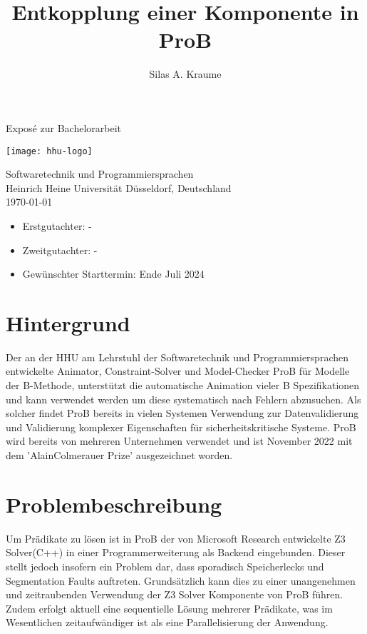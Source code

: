 \documentclass[11pt,a4paper]{scrartcl}
\begin{document}
\author{Silas A. Kraume}
\title{Entkopplung einer Komponente in ProB}

\begin{titlepage}
    \begin{center}
        \vspace*{1cm}
        \Huge
        \makeatletter
        \textbf{\@title}
        \makeatother
        \vspace{1.5cm}

        \LARGE
        \makeatletter
        \textbf{\@author}
        \makeatother
        \vfill

        Exposé zur Bachelorarbeit

        \vfill

        \texttt{[image: hhu-logo]}

        \Large
        Softwaretechnik und Programmiersprachen\\
        Heinrich Heine Universität Düsseldorf, Deutschland\\
        \today
        \vfill

        \large\begin{itemize}
            \item Erstgutachter: \space\space\space -
            \item Zweitgutachter: -
            \item Gewünschter Starttermin: Ende Juli 2024
        \end{itemize}

    \end{center}
\end{titlepage}

\section{Hintergrund}
Der an der HHU am Lehrstuhl der Softwaretechnik und Programmiersprachen entwickelte Animator, Constraint-Solver und Model-Checker ProB \parencite{ProB_2} für Modelle der B-Methode,
unterstützt die automatische Animation vieler B Spezifikationen und kann verwendet werden um diese systematisch nach Fehlern abzusuchen.
Als solcher findet ProB bereits in vielen Systemen Verwendung zur Datenvalidierung und Validierung komplexer Eigenschaften für sicherheitskritische Systeme.
ProB wird bereits von mehreren Unternehmen verwendet und ist November 2022 mit dem 'AlainColmerauer Prize' ausgezeichnet worden.

\section{Problembeschreibung}
Um Prädikate zu lösen ist in ProB der von Microsoft Research entwickelte Z3 Solver(C++) \parencite{Z3_2} in einer Programmerweiterung als Backend eingebunden.
Dieser stellt jedoch insofern ein Problem dar, dass sporadisch Speicherlecks und Segmentation Faults auftreten.
Grundsätzlich kann dies zu einer unangenehmen und zeitraubenden Verwendung der Z3 Solver Komponente von ProB führen.
Zudem erfolgt aktuell eine sequentielle Lösung mehrerer Prädikate, was im Wesentlichen zeitaufwändiger ist als eine Parallelisierung der Anwendung.
\end{document}
